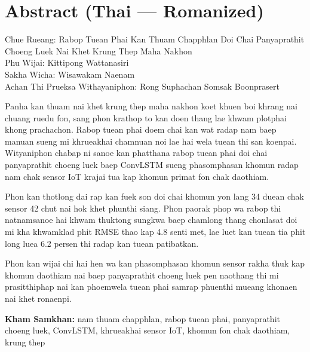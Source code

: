 \chapter*{Abstract (Thai --- Romanized)}


\vspace{0.4cm}
\noindent
Chue Rueang: Rabop Tuean Phai Kan Thuam Chapphlan Doi Chai Panyaprathit Choeng Luek Nai Khet Krung Thep Maha Nakhon\\[4pt]
Phu Wijai: Kittipong Wattanasiri\\[4pt]
Sakha Wicha: Wisawakam Naenam\\[4pt]
Achan Thi Prueksa Withayaniphon: Rong Suphachan Somsak Boonprasert

\vspace{0.4cm}
\noindent
Panha kan thuam nai khet krung thep maha nakhon koet khuen boi khrang nai chuang ruedu fon, sang phon krathop to kan doen thang lae khwam plotphai khong prachachon. Rabop tuean phai doem chai kan wat radap nam baep manuan sueng mi khrueakhai chamnuan noi lae hai wela tuean thi san koenpai. Wityaniphon chabap ni sanoe kan phatthana rabop tuean phai doi chai panyaprathit choeng luek baep ConvLSTM sueng phasomphasan khomun radap nam chak sensor IoT krajai tua kap khomun primat fon chak daothiam.

\noindent
Phon kan thotlong dai rap kan fuek son doi chai khomun yon lang 34 duean chak sensor 42 chut nai hok khet phunthi siang. Phon paorak phop wa rabop thi natnamsanoe hai khwam thuktong sungkwa baep chamlong thang chonlasat doi mi kha khwamklad phit RMSE thao kap 4.8 senti met, lae luet kan tuean tia phit long luea 6.2 persen thi radap kan tuean patibatkan.

\noindent
Phon kan wijai chi hai hen wa kan phasomphasan khomun sensor rakha thuk kap khomun daothiam nai baep panyaprathit choeng luek pen naothang thi mi prasitthiphap nai kan phoemwela tuean phai samrap phuenthi mueang khonaen nai khet ronaenpi.

\vspace{0.4cm}
\noindent\textbf{Kham Samkhan:} nam thuam chapphlan, rabop tuean phai, panyaprathit choeng luek, ConvLSTM, khrueakhai sensor IoT, khomun fon chak daothiam, krung thep

